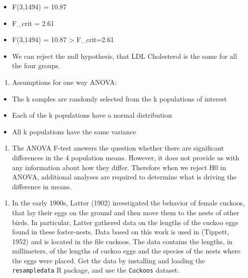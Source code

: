 \documentclass[]{article}
\providecommand{\tightlist}{%
  \setlength{\itemsep}{0pt}\setlength{\parskip}{0pt}}
\begin{document}
\begin{itemize}
\tightlist
\item
  F(3,1494) = 10.87
\item
  F\_crit = 2.61
\item
  F(3,1494) = 10.87 \textgreater{} F\_crit=2.61
\item
  We can reject the null hypothesis, that LDL Cholesterol is the same
  for all the four groups.
\end{itemize}

\begin{enumerate}
\def\labelenumi{\alph{enumi}.}
\setcounter{enumi}{2}
\tightlist
\item
  Assumptions for one way ANOVA:
\end{enumerate}

\begin{itemize}
\tightlist
\item
  The k samples are randomly selected from the k populations of interest
\item
  Each of the k populations have a normal distribution
\item
  All k populations have the same variance
\end{itemize}

\begin{enumerate}
\def\labelenumi{\alph{enumi}.}
\setcounter{enumi}{3}
\tightlist
\item
  The ANOVA F-test answers the question whether there are significant
  differences in the 4 population means. However, it does not provide us
  with any information about how they differ. Therefore when we reject
  H0 in ANOVA, additional analyses are required to determine what is
  driving the difference in means.
\end{enumerate}

\begin{enumerate}
\def\labelenumi{\arabic{enumi}.}
\setcounter{enumi}{1}
\tightlist
\item
  In the early 1900s, Latter (1902) investigated the behavior of female
  cuckoos, that lay their eggs on the ground and then move them to the
  nests of other birds. In particular, Latter gathered data on the
  lengths of the cuckoo eggs found in these foster-nests. Data based on
  this work is used in (Tippett, 1952) and is located in the file
  cuckoos. The data contains the lengths, in millimeters, of the lengths
  of cuckoo eggs and the species of the nests where the eggs were
  placed. Get the data by installing and loading the
  \texttt{resampledata} R package, and use the \texttt{Cuckoos} dataset.
\end{enumerate}
\end{document}
